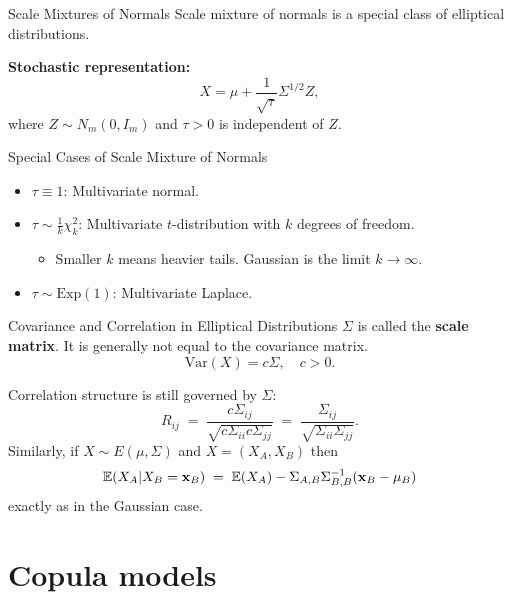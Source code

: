 \documentclass[11pt,handout,aspectratio=169]{beamer}
\begin{document}
\begin{frame}{Scale Mixtures of Normals}
Scale mixture of normals is a special class of elliptical distributions. 
\bigskip

  \textbf{Stochastic representation:}
  \begin{equation*}
    X = \mu + \frac{1}{\sqrt{\tau}} \Sigma^{1/2} Z,
  \end{equation*}
  where $Z \sim N_m(0, I_m)$ and $\tau > 0$ is independent of $Z$.
  \vspace{0.5cm}
  \begin{block}{Special Cases of Scale Mixture of Normals}
  	  \begin{itemize}
    \item $\tau \equiv 1$: Multivariate normal.
    \item $\tau \sim \frac{1}{k} \chi^2_k$: Multivariate $t$-distribution with $k$ degrees of freedom.
    \begin{itemize}
    \item Smaller $k$ means heavier tails. Gaussian is the limit $k\to \infty$.
    \end{itemize}
    \item $\tau \sim \text{Exp}(1)$: Multivariate Laplace.
  \end{itemize}
    \end{block}
\end{frame}

\begin{frame}{Covariance and Correlation in Elliptical Distributions}
$\Sigma$ is called the \textbf{scale matrix}. It is generally not equal to the covariance matrix.
\medskip
      \begin{equation*}
        \mathrm{Var}(X) = c \Sigma, \quad c > 0.
      \end{equation*}

Correlation structure is still governed by $\Sigma$:
$$
R_{ij}\;=\;\frac{c\Sigma_{ij}}{\sqrt{c\Sigma_{ii}c\Sigma_{jj}}}\;=\;\frac{\Sigma_{ij}}{\sqrt{\Sigma_{ii}\Sigma_{jj}}}.
$$
Similarly, if $X\sim E(\mu,\Sigma)$ and $X=(X_A,X_B)$ then 
$$
\mathbb E(X_A|X_B=\mathbf{x}_B)\;=\;\mathbb E(X_A)-\Sigma_{A,B}\Sigma_{B,B}^{-1}(\mathbf{x}_B-\mu_B)
$$
exactly as in the Gaussian case.
\end{frame}

\section{Copula models}
\end{document}

